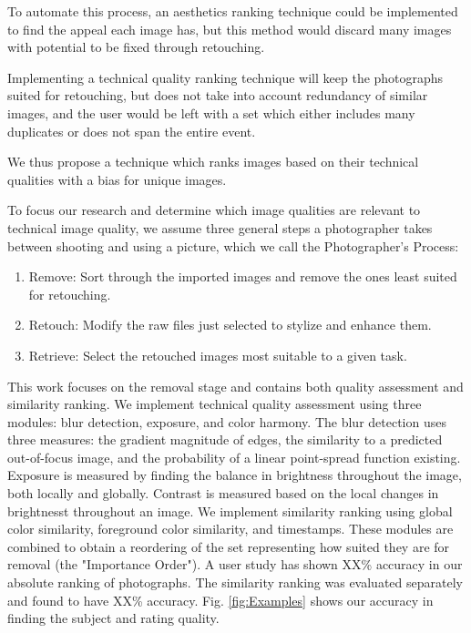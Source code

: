 \documentclass{article}
\begin{document}
To automate this process, an aesthetics ranking technique could be implemented to find the appeal each image has, but this method would discard many images with potential to be fixed through retouching.


Implementing a technical quality ranking technique will keep the photographs suited for retouching, but does not take into account redundancy of similar images, and the user would be left with a set which either includes many duplicates or does not span the entire event.


We thus propose a technique which ranks images based on their technical qualities with a bias for unique images.%

To focus our research and determine which image qualities are relevant to technical image quality, we assume three general steps a photographer takes between shooting and using a picture, which we call the Photographer's Process:
\begin{enumerate}
\item Remove: Sort through the imported images and remove the ones least suited for retouching.
\item Retouch: Modify the raw files just selected to stylize and enhance them.
\item Retrieve: Select the retouched images most suitable to a given task.
\end{enumerate}

This work focuses on the removal stage and contains both quality assessment and similarity ranking. We implement technical quality assessment using three modules: blur detection, exposure, and color harmony. The blur detection uses three measures: the gradient magnitude of edges, the similarity to a predicted out-of-focus image, and the probability of a linear point-spread function existing. Exposure is measured by finding the balance in brightness throughout the image, both locally and globally. Contrast is measured based on the local changes in brightnesst throughout an image. We implement similarity ranking using global color similarity, foreground color similarity, and timestamps.  These modules are combined to obtain a reordering of the set representing how suited they are for removal (the "Importance Order"). A user study has shown XX\% accuracy in our absolute ranking of photographs. The similarity ranking was evaluated separately and found to have XX\% accuracy. Fig. \ref{fig:Examples} shows our accuracy in finding the subject and rating quality.%
\end{document}
